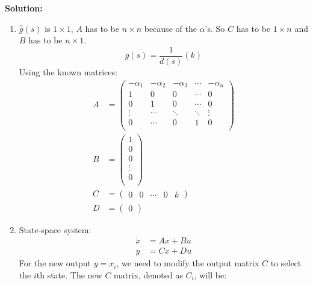\documentclass[12pt]{article}
\newenvironment{solution}{
    \textbf{Solution:}
    
}{
    
    \vspace{2em}
}
\begin{document}
\begin{solution}
    \begin{enumerate}[label=(\alph*)]
        \item \(\hat{g}(s)\) is \(1 \times 1\), \(A\) has to be \(n \times n\) because of the \(\alpha\)'s. So \(C\) has to be \(1 \times n\) and \(B\) has to be \(n \times 1\).
        \[
            \hat{g}(s) = \frac{1}{d(s)} (k)
        \]
        Using the known matrices:
        \[
            \begin{aligned}
                A &= \begin{pmatrix}
                    -\alpha_1 & -\alpha_2 & -\alpha_3 & \cdots & -\alpha_n \\
                    1 & 0 & 0 & \cdots & 0 \\
                    0 & 1 & 0 & \cdots & 0 \\
                    \vdots & \cdots & \ddots & \ddots & \vdots \\
                    0 & \cdots & 0 & 1 & 0 \\
                \end{pmatrix}\\
                B &= \begin{pmatrix}
                    1 \\
                    0 \\
                    0 \\
                    \vdots \\
                    0 \\
                \end{pmatrix}\\
                C &= \begin{pmatrix}
                    0 & 0 & \cdots & 0 & k
                \end{pmatrix}\\
                D &= \begin{pmatrix}
                    0
                \end{pmatrix}
            \end{aligned}
        \]
        \item State-space system:
        \[
            \begin{aligned}
                \dot{x} &= Ax + Bu \\
                y &= Cx + Du
            \end{aligned}
        \]
        For the new output \(y = x_i\), we need to modify the output matrix \(C\) to select the \(i\)th state. The new \(C\) matrix, denoted as \(C_i\), will be:

\end{enumerate}
\end{solution}
\end{document}
